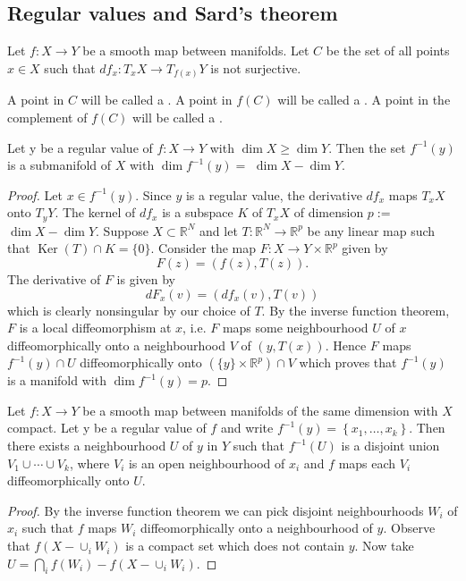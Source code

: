 \documentclass[10pt]{article}
\begin{document}
\subsection{Regular values and Sard's theorem}
Let $f: X \rightarrow Y$ be a smooth map between manifolds. Let $C$ be the set of all points $x \in X$ such that $d f_{x}: T_{x} X \rightarrow T_{f(x)} Y$ is not surjective.

\begin{definition}
    A point in $C$ will be called a . A point in $f(C)$ will be called a . A point in the complement of $f(C)$ will be called a .
\end{definition}

\begin{theorem}
    Let y be a regular value of $f: X \rightarrow Y$ with $\operatorname{dim} X \geq \operatorname{dim} Y$. Then the set $f^{-1}(y)$ is a submanifold of $X$ with $\operatorname{dim} f^{-1}(y)=$ $\operatorname{dim} X-\operatorname{dim} Y$.
\end{theorem}
\begin{proof}
    Let $x \in f^{-1}(y)$. Since $y$ is a regular value, the derivative $d f_{x}$ maps $T_{x} X$ onto $T_{y} Y$. The kernel of $d f_{x}$ is a subspace $K$ of $T_{x} X$ of dimension $p:=$ $\operatorname{dim} X-\operatorname{dim} Y$. Suppose $X \subset \mathbb{R}^{N}$ and let $T: \mathbb{R}^{N} \rightarrow \mathbb{R}^{p}$ be any linear map such that $\operatorname{Ker}(T) \cap K=\{0\}$. Consider the map $F: X \rightarrow Y \times \mathbb{R}^{p}$ given by
$$
F(z)=(f(z), T(z)).
$$
The derivative of $F$ is given by
$$
d F_{x}(v)=\left(d f_{x}(v), T(v)\right)
$$
which is clearly nonsingular by our choice of $T$. By the inverse function theorem, $F$ is a local diffeomorphism at $x$, i.e. $F$ maps some neighbourhood $U$ of $x$ diffeomorphically onto a neighbourhood $V$ of $(y, T(x))$. Hence $F$ maps $f^{-1}(y) \cap U$ diffeomorphically onto $\left(\{y\} \times \mathbb{R}^{p}\right) \cap V$ which proves that $f^{-1}(y)$ is a manifold with $\operatorname{dim} f^{-1}(y)=p$.
\end{proof}


\begin{theorem}
    Let $f: X \rightarrow Y$ be a smooth map between manifolds of the same dimension with $X$ compact. Let y be a regular value of $f$ and write $f^{-1}(y)=\left\{x_{1}, \ldots, x_{k}\right\}$. Then there exists a neighbourhood $U$ of $y$ in $Y$ such that $f^{-1}(U)$ is a disjoint union $V_{1} \cup \cdots \cup V_{k}$, where $V_{i}$ is an open neighbourhood of $x_{i}$ and $f$ maps each $V_{i}$ diffeomorphically onto $U$.
\end{theorem}
\begin{proof}
    By the inverse function theorem we can pick disjoint neighbourhoods $W_{i}$ of $x_{i}$ such that $f$ maps $W_{i}$ diffeomorphically onto a neighbourhood of $y$. Observe that $f\left(X-\cup_{i} W_{i}\right)$ is a compact set which does not contain $y$. Now take
$
U=\bigcap_{i} f\left(W_{i}\right)-f\left(X-\cup_{i} W_{i}\right).
$
\end{proof}
\end{document}
